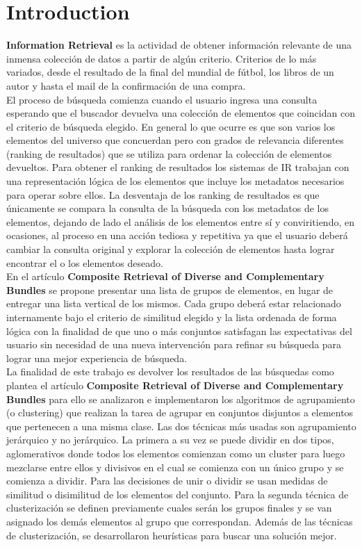 \section{Introduction}
\textbf{Information Retrieval} es la actividad de obtener información relevante de una inmensa colección de datos a partir de algún criterio. Criterios de lo más variados, desde el resultado de la final del mundial de fútbol, los libros de un autor y hasta el mail de la confirmación de una compra.\\
El proceso de búsqueda comienza cuando el usuario ingresa una consulta esperando que el buscador devuelva una colección de elementos que coincidan con el criterio de búsqueda elegido. En general lo que ocurre es que son varios los elementos del universo que concuerdan pero con grados de relevancia diferentes (ranking de resultados) que se utiliza para ordenar la colección de elementos devueltos. Para obtener el ranking de resultados los sistemas de IR trabajan con una representación lógica de los elementos que incluye los metadatos necesarios para operar sobre ellos. La desventaja de los ranking de resultados es que únicamente se compara la consulta de la búsqueda con los metadatos de los elementos, dejando de lado el análisis de los elementos entre sí y conviritiendo, en ocasiones, al proceso en una acción tediosa y repetitiva ya que el usuario deberá cambiar la consulta original y explorar la colección de elementos hasta lograr encontrar el o los elementos deseado.\\
En el  artículo \textbf{Composite Retrieval of Diverse and Complementary Bundles}\cite{compositeRetrival} se propone presentar una lista de grupos de elementos, en lugar de entregar una lista vertical de los mismos. Cada grupo deberá estar relacionado internamente bajo el criterio de similitud elegido y la lista ordenada de forma lógica con la finalidad de que uno o más conjuntos satisfagan las expectativas del usuario sin necesidad de una nueva intervención para refinar su búsqueda para lograr una mejor experiencia de búsqueda.\\
La finalidad de este trabajo es devolver los resultados de las búsquedas como plantea el artículo \textbf{Composite Retrieval of Diverse and Complementary Bundles} para ello se analizaron e implementaron los algoritmos de agrupamiento (o clustering) que realizan la tarea de agrupar en conjuntos disjuntos a elementos que pertenecen a una misma clase. Las dos técnicas más usadas son agrupamiento jerárquico y no jerárquico. La primera a su vez se puede dividir en dos tipos, aglomerativos donde todos los elementos comienzan como un cluster para luego mezclarse entre ellos y divisivos en el cual se comienza con un único grupo y se comienza a dividir. Para las decisiones de unir o dividir se usan medidas de similitud o disimilitud de los elementos del conjunto. Para la segunda técnica de clusterización se definen previamente cuales serán los grupos finales y se van asignado los demás elementos al grupo que correspondan. Además de las técnicas de clusterización, se desarrollaron heurísticas para buscar una solución mejor.\\